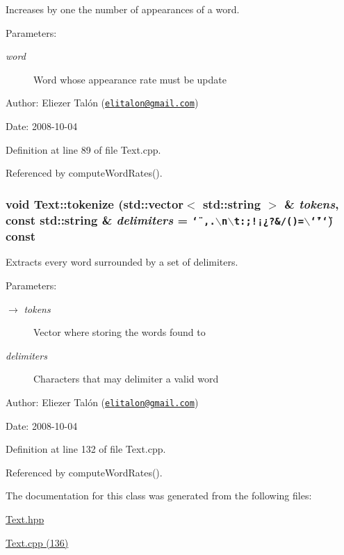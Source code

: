 Increases by one the number of appearances of a word. 

\begin{Desc}
\item[Parameters:]
\begin{description}
\item[{\em word}]Word whose appearance rate must be update\end{description}
\end{Desc}
\begin{Desc}
\item[Author:]Eliezer Talón (\href{mailto:elitalon@gmail.com}{\tt elitalon@gmail.com}) \end{Desc}
\begin{Desc}
\item[Date:]2008-10-04 \end{Desc}


Definition at line 89 of file Text.cpp.

Referenced by computeWordRates().\hypertarget{class_text_6b26c004c1cac61015f7d49c364a007d}{
\subsubsection[tokenize]{\setlength{\rightskip}{0pt plus 5cm}void Text::tokenize (std::vector$<$ std::string $>$ \& {\em tokens}, \/  const std::string \& {\em delimiters} = {\tt \char`\"{}~,.$\backslash$n$\backslash$t:;!¡¿?\&/()=$\backslash$\char`\"{}'\char`\"{}}) const}}
\label{class_text_6b26c004c1cac61015f7d49c364a007d}


Extracts every word surrounded by a set of delimiters. 

\begin{Desc}
\item[Parameters:]
\begin{description}
\item[\mbox{$\rightarrow$} {\em tokens}]Vector where storing the words found to \item[{\em delimiters}]Characters that may delimiter a valid word\end{description}
\end{Desc}
\begin{Desc}
\item[Author:]Eliezer Talón (\href{mailto:elitalon@gmail.com}{\tt elitalon@gmail.com}) \end{Desc}
\begin{Desc}
\item[Date:]2008-10-04 \end{Desc}


Definition at line 132 of file Text.cpp.

Referenced by computeWordRates().

The documentation for this class was generated from the following files:\begin{CompactItemize}
\item 
\hyperlink{_text_8hpp}{Text.hpp}\item 
\hyperlink{_text_8cpp}{Text.cpp (136)}\end{CompactItemize}
